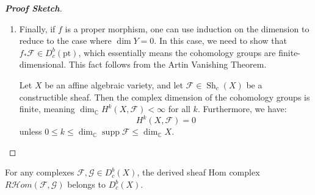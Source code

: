 \begin{proof}[\textbf{Proof Sketch}]
\begin{enumerate}
\begin{enumerate}
Using this resolution, the problem reduces to a local computation for the normal crossing case, specifically an embedding of the form $i \colon \{0\} \times \mathbb{C}^d \hookrightarrow \mathbb{C}^{n-d} \times \mathbb{C}^d$. From here, one applies an ad hoc argument (details of which can be found in the appendix of Achar's book).
\end{enumerate}
\item Finally, if $f$ is a proper morphism, one can use induction on the dimension to reduce to the case where $\dim Y = 0$. In this case, we need to show that $f_* \mathcal{F} \in D^b_c(\text{pt})$, which essentially means the cohomology groups are finite-dimensional. This fact follows from the Artin Vanishing Theorem.
\begin{theorem}
Let $X$ be an affine algebraic variety, and let $\mathcal{F} \in \operatorname{Sh}_c(X)$ be a constructible sheaf. Then the complex dimension of the cohomology groups is finite, meaning $\dim_{\mathbb{C}} H^k(X, \mathcal{F}) < \infty$ for all $k$. Furthermore, we have:
\begin{equation*}
    H^k(X, \mathcal{F}) = 0
\end{equation*}
unless $0 \leq k \leq \dim_{\mathbb{C}} \operatorname{supp} \mathcal{F} \leq \dim_{\mathbb{C}} X$.
\end{theorem}
\end{enumerate}
\end{proof}

\begin{proposition}
For any complexes $\mathcal{F}, \mathcal{G} \in D^b_c(X)$, the derived sheaf Hom complex $R\mathcal{H}om(\mathcal{F}, \mathcal{G})$ belongs to $D^b_c(X)$.
\end{proposition}

